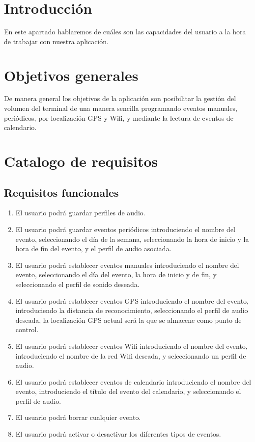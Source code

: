 
\section{Introducción}
En este apartado hablaremos de cuáles son las capacidades del usuario a la hora de trabajar con nuestra aplicación.

\section{Objetivos generales}
De manera general los objetivos de la aplicación son posibilitar la gestión del volumen del terminal de una manera sencilla programando eventos manuales, periódicos, por localización GPS y Wifi, y mediante la lectura de eventos de calendario.

\section{Catalogo de requisitos}
\subsection{Requisitos funcionales}
\begin{enumerate}
	\item El usuario podrá guardar perfiles de audio.
	\item El usuario podrá guardar eventos periódicos introduciendo el nombre del evento, seleccionando el día de la semana, seleccionando la hora de inicio y la hora de fin del evento, y el perfil de audio asociada.
	\item El usuario podrá establecer eventos manuales introduciendo el nombre del evento, seleccionando el día del evento, la hora de inicio y de fin, y seleccionando el perfil de sonido deseada.
	\item El usuario podrá establecer eventos GPS introduciendo el nombre del evento, introduciendo la distancia de reconocimiento, seleccionando el perfil de audio deseada, la localización GPS actual será la que se almacene como punto de control.
	\item El usuario podrá establecer eventos Wifi introduciendo el nombre del evento, introduciendo el nombre de la red Wifi deseada, y seleccionando un perfil de audio.
	\item El usuario podrá establecer eventos de calendario introduciendo el nombre del evento, introduciendo el título del evento del calendario, y seleccionando el perfil de audio.
	\item El usuario podrá borrar cualquier evento.
	\item El usuario podrá activar o desactivar los diferentes tipos de eventos.
\end{enumerate}

